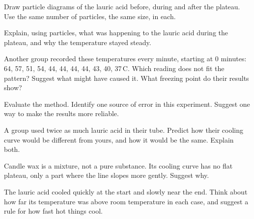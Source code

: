 \task Draw particle diagrams of the lauric acid before, during and after the plateau. Use the same number of particles, the same size, in each. 

\noindent
\begin{minipage}[t]{0.32\linewidth}\centering{}\end{minipage}\hfill
\begin{minipage}[t]{0.32\linewidth}\centering{}\end{minipage}\hfill
\begin{minipage}[t]{0.32\linewidth}\centering{}\end{minipage}

\task Explain, using particles, what was happening to the lauric acid during the plateau, and why the temperature stayed steady. 
\answerbox{5cm}

\task Another group recorded these temperatures every minute, starting at 0 minutes: 64, 57, 51, 54, 44, 44, 44, 44, 43, 40, 37\,\textdegree C. 
Which reading does not fit the pattern?
\answerbox{1cm}
Suggest what might have caused it.
\answerbox{5cm}
What freezing point do their results show?
\answerbox{1cm}

\task Evaluate the method. 
Identify one source of error in this experiment.
\answerbox{5cm}
Suggest one way to make the results more reliable.
\answerbox{5cm}

\begin{yr8box}
\begin{keepext}
\exttask A group used twice as much lauric acid in their tube. Predict how their cooling curve would be different from yours, and how it would be the same. Explain both.
\answerbox{5cm}
\end{keepext}
\begin{keepext}
\exttask Candle wax is a mixture, not a pure substance. Its cooling curve has no flat plateau, only a part where the line slopes more gently. Suggest why.
\answerbox{5cm}
\end{keepext}
\begin{keepext}
\exttask The lauric acid cooled quickly at the start and slowly near the end. Think about how far its temperature was above room temperature in each case, and suggest a rule for how fast hot things cool.
\answerbox{5cm}
\end{keepext}
\end{yr8box}

